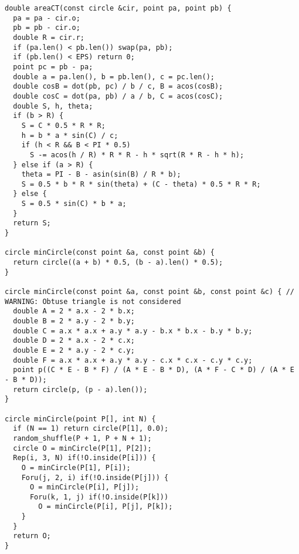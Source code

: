 \begin{lstlisting}
double areaCT(const circle &cir, point pa, point pb) {
  pa = pa - cir.o;
  pb = pb - cir.o;
  double R = cir.r;
  if (pa.len() < pb.len()) swap(pa, pb);
  if (pb.len() < EPS) return 0;
  point pc = pb - pa;
  double a = pa.len(), b = pb.len(), c = pc.len();
  double cosB = dot(pb, pc) / b / c, B = acos(cosB);
  double cosC = dot(pa, pb) / a / b, C = acos(cosC);
  double S, h, theta;
  if (b > R) {
    S = C * 0.5 * R * R;
    h = b * a * sin(C) / c;
    if (h < R && B < PI * 0.5)
      S -= acos(h / R) * R * R - h * sqrt(R * R - h * h);
  } else if (a > R) {
    theta = PI - B - asin(sin(B) / R * b);
    S = 0.5 * b * R * sin(theta) + (C - theta) * 0.5 * R * R;
  } else {
    S = 0.5 * sin(C) * b * a;
  }
  return S;
}

circle minCircle(const point &a, const point &b) {
  return circle((a + b) * 0.5, (b - a).len() * 0.5);
}

circle minCircle(const point &a, const point &b, const point &c) { // WARNING: Obtuse triangle is not considered
  double A = 2 * a.x - 2 * b.x;
  double B = 2 * a.y - 2 * b.y;
  double C = a.x * a.x + a.y * a.y - b.x * b.x - b.y * b.y;
  double D = 2 * a.x - 2 * c.x;
  double E = 2 * a.y - 2 * c.y;
  double F = a.x * a.x + a.y * a.y - c.x * c.x - c.y * c.y;
  point p((C * E - B * F) / (A * E - B * D), (A * F - C * D) / (A * E - B * D));
  return circle(p, (p - a).len());
}

circle minCircle(point P[], int N) {
  if (N == 1) return circle(P[1], 0.0);
  random_shuffle(P + 1, P + N + 1);
  circle O = minCircle(P[1], P[2]);
  Rep(i, 3, N) if(!O.inside(P[i])) {
    O = minCircle(P[1], P[i]);
    Foru(j, 2, i) if(!O.inside(P[j])) {
      O = minCircle(P[i], P[j]);
      Foru(k, 1, j) if(!O.inside(P[k]))
        O = minCircle(P[i], P[j], P[k]);
    }
  }
  return O;
}

\end{lstlisting}